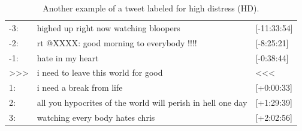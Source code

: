\documentclass[11pt]{article}
\begin{document}
\begin{table}[h]
\footnotesize
\begin{tabular}{|p{0.8cm}|p{4.25cm}|p{1.2cm}|}
\hline
-3:                                  & highed up right now watching bloopers                                                                                                              & {[}-11:33:54{]}              \\
-2:                                  & rt @XXXX: good morning to everybody !!!!                                                                                                            & {[}-8:25:21{]}              \\
-1:                                  & hate in my heart                                                                                                        & {[}-0:38:44{]}              \\
\textgreater\textgreater\textgreater & i need to leave this world for good  & \textless\textless\textless \\
1:                                   & i need a break from life & {[}+0:00:33{]}              \\
2:                                   & all you hypocrites of the world will perish in hell one day                                                                                                                        & {[}+1:29:39{]}              \\
3:                                   & watching every body hates chris                                                                                                                                           & {[}+2:02:56{]}              \\ \hline
\end{tabular}
\caption{Another example of a tweet labeled for high distress (HD).}
\label{fig-hdeg2}
\end{table}
\end{document}
